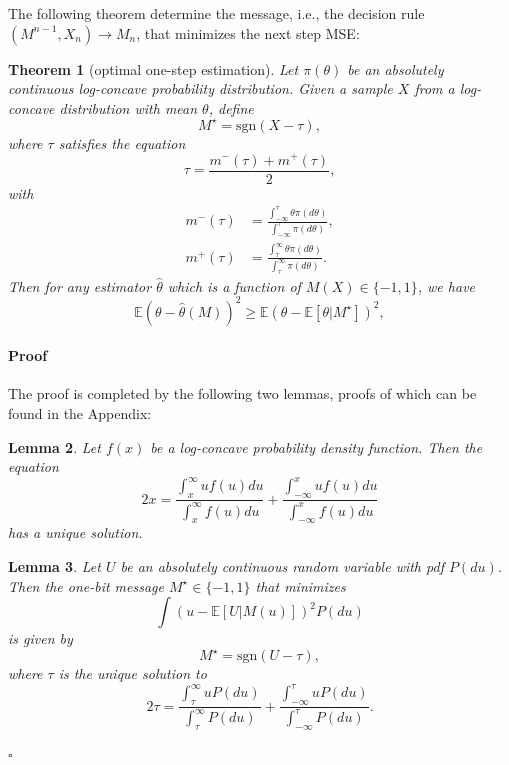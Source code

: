 \documentclass[letterpaper, conference, 11pt]{IEEEtran}      %
\newtheorem{thm}{\bf{Theorem}}
\newtheorem{lem}[thm]{\bf {Lemma}}
\newenvironment{proof}{\paragraph*{Proof}}{\hfill$\square$ \newline}
\newcommand{\sgn}{\mathrm{sgn} }
\begin{document}
The following theorem determine the message, i.e., the decision rule $(M^{n-1},X_n)\rightarrow M_n$, that minimizes the next step MSE:
\begin{thm}[optimal one-step estimation] \label{thm:opt_one_step}
Let $\pi(\theta)$ be an absolutely continuous log-concave probability distribution. Given a sample $X$ from a log-concave distribution with mean $\theta$, define 
\begin{equation}
\label{eq:adaptive_main_message}
M^\star = \sgn(X - \tau),
\end{equation}
where $\tau$ satisfies the equation
\begin{equation}
 \label{eq:fixed_point}
 \tau = \frac{m^-(\tau) + m^+(\tau)}{2},
\end{equation}
with
\begin{align*}
m^-(\tau)  & = \frac{\int_{-\infty}^{\tau} \theta \pi(d\theta) }{\int_{-\infty}^{\tau} \pi(d\theta)} ,\\
m^+(\tau) & = \frac{\int_{\tau}^\infty \theta \pi(d\theta) }{\int_{\tau}^\infty \pi(d\theta)} .
\end{align*}
Then for any estimator $\hat{\theta}$ which is a function of $M(X) \in \{-1,1\}$, we have
\begin{equation}
\label{eq:opt_cond}
\mathbb E \left(\theta-\hat{\theta}(M)\right)^2 \geq  \mathbb E \left(\theta- \mathbb E[\theta|M^\star]\right)^2,
\end{equation}
\end{thm}

\begin{proof}
The proof is completed by the following two lemmas, proofs of which can be found in the Appendix:
\begin{lem} \label{lem:unique}
Let $f(x)$ be a log-concave probability density function. Then the equation 
\begin{equation}
\label{eq:lem_fixed_point}
2x = \frac{\int_x^\infty uf(u)du}{\int_x^\infty f(u)du} + \frac{\int_{-\infty}^x uf(u)du}{\int_{-\infty}^x f(u)du} 
\end{equation}
has a unique solution.
\end{lem}
\begin{lem} \label{lem:adaptive}
Let $U$ be an absolutely continuous random variable with pdf $P(du)$. Then the one-bit message $M^\star\in \{-1,1\}$ that minimizes
\[
\int \left( u - \mathbb E[U|M(u)]  \right)^2 P(du)
\]
is given by
\[
M^\star  =  \sgn(U - \tau),
\]
where $\tau$ is the unique solution to
 \[
2 \tau = \frac{\int_{\tau}^\infty u P(du)} {\int_{\tau}^\infty P(du)} + \frac{\int_{-\infty}^{\tau} u P(du)}{\int_{-\infty}^{\tau} P(du)}.
\]
\end{lem}
\end{proof}
\end{document}
